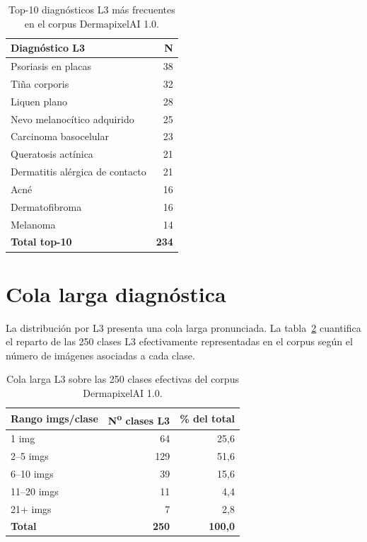 \begin{table}[H]
\centering
\small
\caption{Top-10 diagnósticos L3 más frecuentes en el corpus
DermapixelAI 1.0.}
\label{tab:anexo-top10-l3}
\begin{tabular}{lr}
\hline
Diagnóstico L3                          & N    \\
\hline
Psoriasis en placas                     & 38   \\
Tiña corporis                           & 32   \\
Liquen plano                            & 28   \\
Nevo melanocítico adquirido             & 25   \\
Carcinoma basocelular                   & 23   \\
Queratosis actínica                     & 21   \\
Dermatitis alérgica de contacto         & 21   \\
Acné                                    & 16   \\
Dermatofibroma                          & 16   \\
Melanoma                                & 14   \\
\hline
\textbf{Total top-10}                   & \textbf{234} \\
\hline
\end{tabular}
\end{table}

\section{Cola larga diagnóstica}
\label{sec:anexo-long-tail}

La distribución por L3 presenta una cola larga pronunciada. La
tabla~\ref{tab:anexo-cola-larga} cuantifica el reparto de las 250
clases L3 efectivamente representadas en el corpus según el número
de imágenes asociadas a cada clase.

\begin{table}[H]
\centering
\footnotesize
\caption{Cola larga L3 sobre las 250 clases efectivas del corpus
DermapixelAI 1.0.}
\label{tab:anexo-cola-larga}
\begin{tabular}{lrr}
\hline
Rango imgs/clase & N\textsuperscript{o} clases L3 & \% del total \\
\hline
1 img       & 64  & 25,6  \\
2--5 imgs   & 129 & 51,6  \\
6--10 imgs  & 39  & 15,6  \\
11--20 imgs & 11  & 4,4   \\
21+ imgs    & 7   & 2,8   \\
\hline
\textbf{Total} & \textbf{250} & \textbf{100,0} \\
\hline
\end{tabular}
\end{table}

